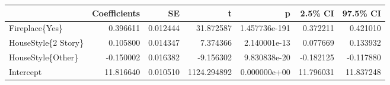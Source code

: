 \begin{tabular}{lrrrrrr}
\toprule
{} &  Coefficients &        SE &            t &              p &    2.5\% CI &   97.5\% CI \\
\midrule
Fireplace\{Yes\}      &      0.396611 &  0.012444 &    31.872587 &  1.457736e-191 &   0.372211 &   0.421010 \\
HouseStyle\{2 Story\} &      0.105800 &  0.014347 &     7.374366 &   2.140001e-13 &   0.077669 &   0.133932 \\
HouseStyle\{Other\}   &     -0.150002 &  0.016382 &    -9.156302 &   9.830838e-20 &  -0.182125 &  -0.117880 \\
Intercept           &     11.816640 &  0.010510 &  1124.294892 &   0.000000e+00 &  11.796031 &  11.837248 \\
\bottomrule
\end{tabular}
